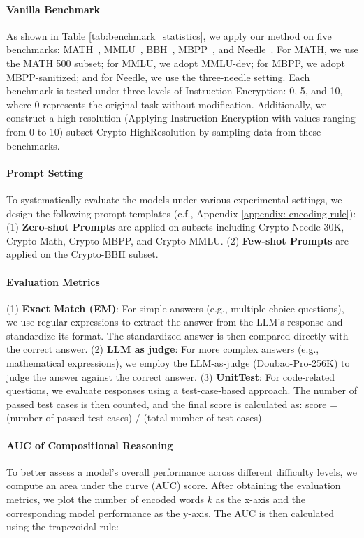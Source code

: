 \paragraph{Vanilla Benchmark}  
As shown in Table \ref{tab:benchmark_statistics}, we apply our method on five benchmarks: MATH~\citep{hendrycks2021measuring}, MMLU~\citep{MMLU}, BBH~\citep{suzgun2022challenging}, MBPP~\citep{austin2021program}, and Needle~\citep{Needle}.  
For MATH, we use the MATH 500 subset; for MMLU, we adopt MMLU-dev; for MBPP, we adopt MBPP-sanitized; and for Needle, we use the three-needle setting.  
Each benchmark is tested under three levels of Instruction Encryption: 0, 5, and 10, where 0 represents the original task without modification.  
Additionally, we construct a high-resolution (Applying Instruction Encryption with values ranging from 0 to 10) subset Crypto-HighResolution by sampling data from these benchmarks.  

\paragraph{Prompt Setting}
To systematically evaluate the models under various experimental settings, we design the following prompt templates (c.f., Appendix \ref{appendix: encoding rule}): (1) \textbf{Zero-shot Prompts} are applied on subsets including Crypto-Needle-30K, Crypto-Math, Crypto-MBPP, and Crypto-MMLU. (2) \textbf{Few-shot Prompts} are applied on the Crypto-BBH subset.

\paragraph{Evaluation Metrics}
(1) \textbf{Exact Match (EM)}: For simple answers (e.g., multiple-choice questions), we use regular expressions to extract the answer from the LLM's response and standardize its format. The standardized answer is then compared directly with the correct answer.  
(2) \textbf{LLM as judge}: For more complex answers (e.g., mathematical expressions), we employ the LLM-as-judge (Doubao-Pro-256K) to judge the answer against the correct answer. 
(3) \textbf{UnitTest}: For code-related questions, we evaluate responses using a test-case-based approach. 
The number of passed test cases is then counted, and the final score is calculated as:
score = (number of passed test cases) / (total number of test cases).
\paragraph{AUC of Compositional Reasoning}  
To better assess a model’s overall performance across different difficulty levels, we compute an area under the curve (AUC) score.  
After obtaining the evaluation metrics, we plot the number of encoded words \( k \) as the x-axis and the corresponding model performance as the y-axis.  
The AUC is then calculated using the trapezoidal rule:  

